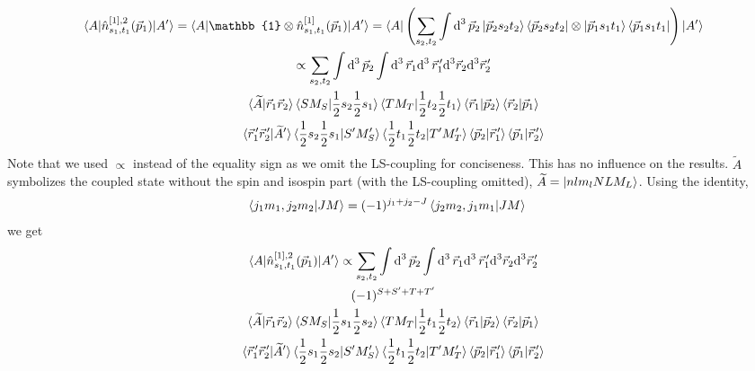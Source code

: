 \documentclass[10pt]{article}
\begin{document}
\begin{multline*}
	\braket{ A | \hat{n}^{[1],2}_{s_1,t_1}(\vec{p}_1)| A'} = \braket{ A | 
\mathbb{1} \otimes \hat{n}^{[1]}_{s_1,t_1}(\vec{p}_1) | A'} = \bra{ A } \left( 
\sum_{s_2,t_2} \int \text{d}^{3} \, \vec{p}_{2} \ket{ \vec{p}_2 s_2 t_2} \bra{ 
\vec{p}_2 s_2 t_2} \otimes \ket{ \vec{p}_1 s_1 t_1} \bra{ \vec{p}_1 s_1 t_1} 
\right) \ket{ A' } \\
	\propto \sum_{s_2,t_2} \int \text{d}^{3} \, \vec{p}_{2} \int \text{d}^{3} \, \vec{r}_{1} \text{d}^{3} \, \vec{r}_{1}^{\,\prime} \text{d}^{3} \vec{r}_{2} \text{d}^{3} \vec{r}_{2}^{\,\prime} \\
	\braket{ \widetilde{A} | \vec{r}_{1} \vec{r}_{2}} \braket { S M_S | \frac{1}{2} s_2 \frac{1}{2} s_1 } \braket{ T M_T | \frac{1}{2} t_2 \frac{1}{2} t_1 } \braket{ \vec{r}_{1} | \vec{p}_{2} } \braket{ \vec{r}_{2} | \vec{p}_{1}} \\
	\braket{ \vec{r}_{1}^{\,\prime} \vec{r}_{2}^{\,\prime} | \widetilde{A}'} \braket{ \frac{1}{2} s_2 \frac{1}{2} s_1 | S' M_S'} \braket{ \frac{1}{2} t_1 \frac{1}{2} t_2 | T' M_T'} \braket{ \vec{p}_2 | \vec{r}_{1}^{\,\prime}} \braket{ \vec{p}_{1} | \vec{r}_{2}^{\,\prime}} \\
\end{multline*}
Note that we used $\propto$ instead of the equality sign as we omit the LS-coupling for conciseness. This has no influence on the results. $\widetilde{A}$ symbolizes the coupled state without the spin and isospin part (with the LS-coupling omitted), $\widetilde{A} = \ket{ n l m_l N L M_L}$.  Using the identity,
\begin{align*}
	\braket{ j_1 m_1, j_2 m_2 | J M } &= (-1)^{j_1 + j_2 - J} \braket{ j_2 m_2, j_1 m_1 | J M} 
\end{align*}
we get
\begin{multline*}
	\braket{ A | \hat{n}^{[1],2}_{s_1,t_1}(\vec{p}_1)| A'}	\propto 
\sum_{s_2,t_2} \int \text{d}^{3} \, \vec{p}_{2} \int \text{d}^{3} \, \vec{r}_{1} 
\text{d}^{3} \, \vec{r}_{1}^{\,\prime} \text{d}^{3} \vec{r}_{2} \text{d}^{3} 
\vec{r}_{2}^{\,\prime} \\
	(-1)^{  S + S' + T + T'} \\
	\braket{ \widetilde{A} | \vec{r}_{1} \vec{r}_{2}} \braket { S M_S | \frac{1}{2} s_1 \frac{1}{2} s_2 } \braket{ T M_T | \frac{1}{2} t_1 \frac{1}{2} t_2 } \braket{ \vec{r}_{1} | \vec{p}_{2} } \braket{ \vec{r}_{2} | \vec{p}_{1}} \\
	\braket{ \vec{r}_{1}^{\,\prime} \vec{r}_{2}^{\,\prime} | \widetilde{A}'} \braket{ \frac{1}{2} s_1 \frac{1}{2} s_2 | S' M_S'} \braket{ \frac{1}{2} t_1 \frac{1}{2} t_2 | T' M_T'} \braket{ \vec{p}_2 | \vec{r}_{1}^{\,\prime}} \braket{ \vec{p}_{1} | \vec{r}_{2}^{\,\prime}} \\
\end{multline*}
\end{document}
